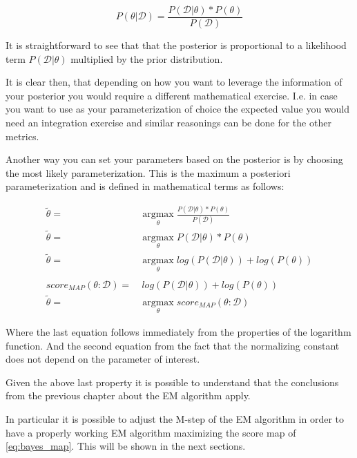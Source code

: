 \documentclass[11pt]{article}
\begin{document}
\begin{article}
\begin{equation} \label{eq:bayes_formula}
P (\theta | \mathscr{D}) = \frac{P (\mathscr{D} | \theta) * P(\theta)}{P (\mathscr{D})} 
\end{equation}

It is straightforward to see that that the posterior is proportional
to a likelihood term \(P (\mathscr{D} | \theta)\) multiplied by the
prior distribution.

It is clear then, that depending on how you want to leverage the
information of your posterior you would require a different
mathematical exercise. I.e. in case you want to use as your
parameterization of choice the expected value you would need an
integration exercise and similar reasonings can be done for the
other metrics.

Another way you can set your parameters based on the posterior is by
choosing the most likely parameterization. This is the maximum a
posteriori parameterization and is defined in mathematical terms as
follows:

\begin{align} 
\tilde{\theta} =& \operatorname*{argmax}_{\theta} \frac{P (\mathscr{D} | \theta) * P(\theta)}{P (\mathscr{D})} \nonumber\\
\tilde{\theta} =& \operatorname*{argmax}_{\theta} P (\mathscr{D} | \theta) * P(\theta)\\ \label{eq:bayes_map}
\tilde{\theta} =& \operatorname*{argmax}_{\theta} log (P (\mathscr{D} | \theta)) + log (P(\theta)) \nonumber \\
\nonumber \\ 
score_{MAP} (\theta : \mathscr{D}) =& \ log (P (\mathscr{D} | \theta)) + log (P(\theta)) \nonumber\\
\tilde{\theta} =& \operatorname*{argmax}_{\theta} score_{MAP}(\theta : \mathscr{D})
\end{align}

Where the last equation follows immediately from the properties of
the logarithm function. And the second equation from the fact that
the normalizing constant does not depend on the parameter of
interest.

Given the above last property it is possible to understand that the
conclusions from the previous chapter about the EM algorithm apply.

In particular it is possible to adjust the M-step of the EM
algorithm in order to have a properly working EM algorithm
maximizing the score map of \ref{eq:bayes_map}. This will be shown in
the next sections. 

\end{article}
\end{document}
